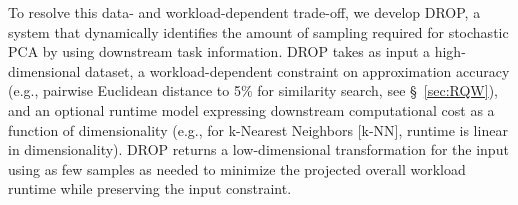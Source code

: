 To resolve this data- and workload-dependent trade-off, we develop DROP, a system that dynamically identifies the amount of sampling required for stochastic PCA by using downstream task information.
DROP takes as input a high-dimensional dataset,
a workload-dependent constraint on approximation accuracy (e.g., pairwise Euclidean distance to 5\% for similarity search, see \S~\ref{sec:RQW}), and an optional runtime model expressing downstream computational cost as a function of dimensionality (e.g., for k-Nearest Neighbors [k-NN], runtime is linear in dimensionality). 
DROP returns a low-dimensional transformation for the input using as few samples as needed to minimize the projected overall workload runtime while preserving the input constraint. 


